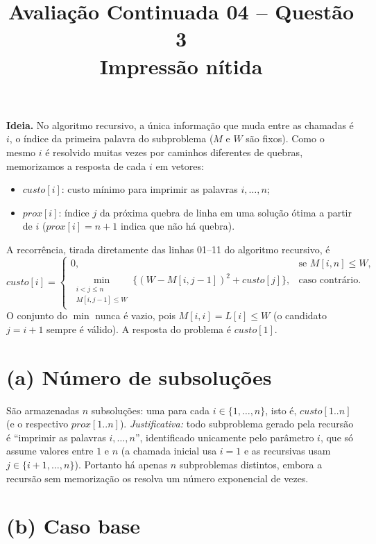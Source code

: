 \documentclass[11pt,a4paper]{article}
\title{Avaliação Continuada 04 -- Questão 3\\ \large Impressão nítida}
\date{}
\begin{document}
\maketitle

\noindent\textbf{Ideia.} No algoritmo recursivo, a única informação que muda entre
as chamadas é $i$, o índice da primeira palavra do subproblema ($M$ e $W$ são
fixos). Como o mesmo $i$ é resolvido muitas vezes por caminhos diferentes de quebras,
memorizamos a resposta de cada $i$ em vetores:
\begin{itemize}
  \item $\mathit{custo}[i]$: custo mínimo para imprimir as palavras $i,\dots,n$;
  \item $\mathit{prox}[i]$: índice $j$ da próxima quebra de linha em uma solução
        ótima a partir de $i$ ($\mathit{prox}[i]=n+1$ indica que não há quebra).
\end{itemize}
A recorrência, tirada diretamente das linhas 01--11 do algoritmo recursivo, é
\[
\mathit{custo}[i] =
\begin{cases}
0, & \text{se } M[i,n] \le W,\\[2pt]
\displaystyle\min_{\substack{i < j \le n\\ M[i,j-1]\le W}}
  \Big\{ (W - M[i,j-1])^2 + \mathit{custo}[j] \Big\}, & \text{caso contrário.}
\end{cases}
\]
O conjunto do $\min$ nunca é vazio, pois $M[i,i]=L[i]\le W$ (o candidato $j=i+1$
sempre é válido). A resposta do problema é $\mathit{custo}[1]$.

\section*{(a) Número de subsoluções}

São armazenadas $n$ subsoluções: uma para cada $i \in \{1,\dots,n\}$, isto é,
$\mathit{custo}[1..n]$ (e o respectivo $\mathit{prox}[1..n]$).
\emph{Justificativa:} todo subproblema gerado pela recursão é ``imprimir as palavras
$i,\dots,n$'', identificado unicamente pelo parâmetro $i$, que só assume valores entre
$1$ e $n$ (a chamada inicial usa $i=1$ e as recursivas usam $j\in\{i+1,\dots,n\}$).
Portanto há apenas $n$ subproblemas distintos, embora a recursão sem memorização os
resolva um número exponencial de vezes.

\section*{(b) Caso base}
\end{document}
